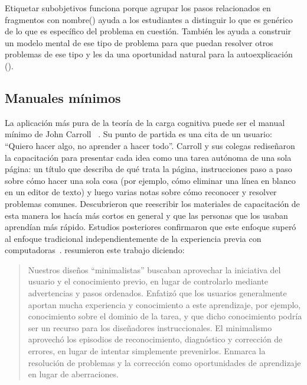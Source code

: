 Etiquetar subobjetivos funciona porque agrupar los pasos relacionados en fragmentos con nombre() 
ayuda a los estudiantes a distinguir lo que es genérico de lo que es específico del problema en cuestión. 
También les ayuda a construir un modelo mental de ese tipo de problema 
para que puedan resolver otros problemas de ese tipo 
y les da una oportunidad natural para la autoexplicación ().

\subsection*{Manuales mínimos}

La aplicación más pura de la teoría de la carga cognitiva puede ser el manual mínimo de 
John Carroll ~\cite{Carr1987,Carr2014}. 
Su punto de partida es una cita de un usuario: ``Quiero hacer algo, no aprender a hacer todo''. 
Carroll y sus colegas rediseñaron la capacitación para presentar cada idea como una tarea autónoma de una sola página: 
un título que describa de qué trata la página, 
instrucciones paso a paso sobre cómo hacer una sola cosa 
(por ejemplo, cómo eliminar una línea en blanco en un editor de texto)
y luego varias notas sobre cómo reconocer y resolver problemas comunes. 
Descubrieron que reescribir los materiales de capacitación de esta manera los hacía más cortos en general 
y que las personas que los usaban aprendían más rápido. 
Estudios posteriores confirmaron que este enfoque superó al enfoque tradicional 
independientemente de la experiencia previa con computadoras~\cite{Lazo1993}.
\cite{Carr2014} resumieron este trabajo diciendo:

\begin{quote}

  Nuestros diseños ``minimalistas'' buscaban aprovechar la iniciativa del usuario y el conocimiento previo, 
  en lugar de controlarlo mediante advertencias y pasos ordenados. 
  Enfatizó que los usuarios generalmente aportan mucha experiencia y conocimiento a este aprendizaje, 
  por ejemplo, 
  conocimiento sobre el dominio de la tarea, 
  y que dicho conocimiento podría ser un recurso para los diseñadores instruccionales. 
  El minimalismo aprovechó los episodios de reconocimiento, diagnóstico y corrección de errores, 
  en lugar de intentar simplemente prevenirlos. 
  Enmarca la resolución de problemas y la corrección como oportunidades de aprendizaje en lugar de aberraciones.

\end{quote}


